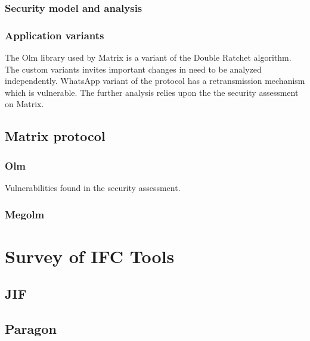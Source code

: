 \subsubsection{Security model and analysis}

\subsubsection{Application variants}

The Olm library used by Matrix is a variant of the Double Ratchet algorithm. The custom variants invites important changes in need to be analyzed independently. WhatsApp variant of the protocol has a retransmission mechanism which is vulnerable. 
The further analysis relies upon the the security assessment on Matrix. 


\subsection{Matrix protocol}

\subsubsection{Olm}
Vulnerabilities found in the security assessment. 

\subsubsection{Megolm}




\section{Survey of IFC Tools}

\subsection{JIF}

\subsection{Paragon}

